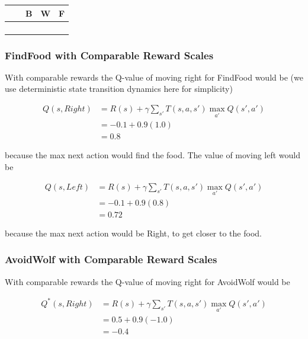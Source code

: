 \begin{center}
\begin{tabular}{|p{1em}|p{1em}|p{1em}|p{1em}|p{1em}|}\hline
  &   & B & W & F \\\hline
  &   &   &   &   \\\hline
  &   &   &   &   \\\hline
  &   &   &   &   \\\hline
  &   &   &   &   \\\hline
\end{tabular}
\end{center}

\subsubsection{FindFood with Comparable Reward Scales}

With comparable rewards the Q-value of moving right for FindFood would be (we use deterministic state transition dynamics here for simplicity)

\begin{align*}
Q(s, Right) &= R(s) + \gamma \sum_{s'} T(s, a, s') \max_{a'} Q(s', a')\\
              &= -0.1 + 0.9 (1.0)\\
              &= 0.8
\end{align*}

because the max next action would find the food. The value of moving left would be

\begin{align*}
Q(s, Left) &= R(s) + \gamma \sum_{s'} T(s, a, s') \max_{a'} Q(s', a')\\
             &= -0.1 + 0.9 (0.8)\\
             &= 0.72
\end{align*}

because the max next action would be Right, to get closer to the food.

\subsubsection{AvoidWolf with Comparable Reward Scales}

With comparable rewards the Q-value of moving right for AvoidWolf would be

\begin{align*}
Q^*(s, Right) &= R(s) + \gamma \sum_{s'} T(s, a, s') \max_{a'} Q(s', a')\\
              &= 0.5 + 0.9 (-1.0)\\
              &= -0.4
\end{align*}

